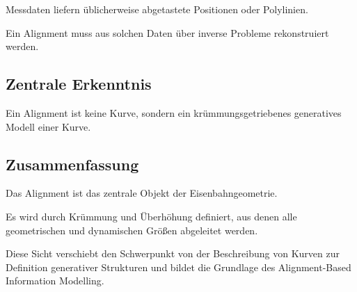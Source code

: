 Messdaten liefern üblicherweise abgetastete Positionen oder Polylinien.

Ein Alignment muss aus solchen Daten über inverse Probleme rekonstruiert
werden.

\subsection{Zentrale Erkenntnis}

\begin{proposition}
Ein Alignment ist keine Kurve, sondern ein krümmungsgetriebenes generatives
Modell einer Kurve.
\end{proposition}

\subsection{Zusammenfassung}

\begin{summary}
Das Alignment ist das zentrale Objekt der Eisenbahngeometrie.

Es wird durch Krümmung und Überhöhung definiert, aus denen alle geometrischen
und dynamischen Größen abgeleitet werden.

Diese Sicht verschiebt den Schwerpunkt von der Beschreibung von Kurven zur
Definition generativer Strukturen und bildet die Grundlage des
Alignment-Based Information Modelling.
\end{summary}
